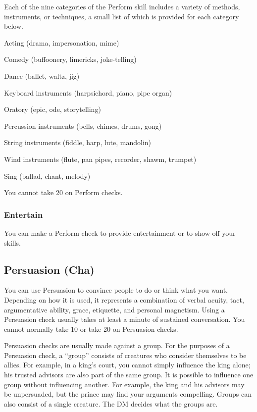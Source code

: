 Each of the nine categories of the Perform skill includes a variety of methods, instruments, or techniques, a small list of which is provided for each category below.
\begin{itemize*}
\item Acting (drama, impersonation, mime)
\item Comedy (buffoonery, limericks, joke-telling)
\item Dance (ballet, waltz, jig)
\item Keyboard instruments (harpsichord, piano, pipe organ)
\item Oratory (epic, ode, storytelling)
\item Percussion instruments (bells, chimes, drums, gong)
\item String instruments (fiddle, harp, lute, mandolin)
\item Wind instruments (flute, pan pipes, recorder, shawm, trumpet)
\item Sing (ballad, chant, melody)
\end{itemize*}

You cannot take 20 on Perform checks.

\subsubsection{Entertain}
You can make a Perform check to provide entertainment or to show off your skills.

\subsection{Persuasion (Cha)}
You can use Persuasion to convince people to do or think what you want. Depending on how it is used, it represents a combination of verbal acuity, tact, argumentative ability, grace, etiquette, and personal magnetism. Using a Persuasion check usually takes at least a minute of sustained conversation. You cannot normally take 10 or take 20 on Persuasion checks.

Persuasion checks are usually made against a group. For the purposes of a Persuasion check, a ``group'' consists of creatures who consider themselves to be allies. For example, in a king's court, you cannot simply influence the king alone; his trusted advisors are also part of the same group. It is possible to influence one group without influencing another. For example, the king and his advisors may be unpersuaded, but the prince may find your arguments compelling. Groups can also consist of a single creature. The DM decides what the groups are.

